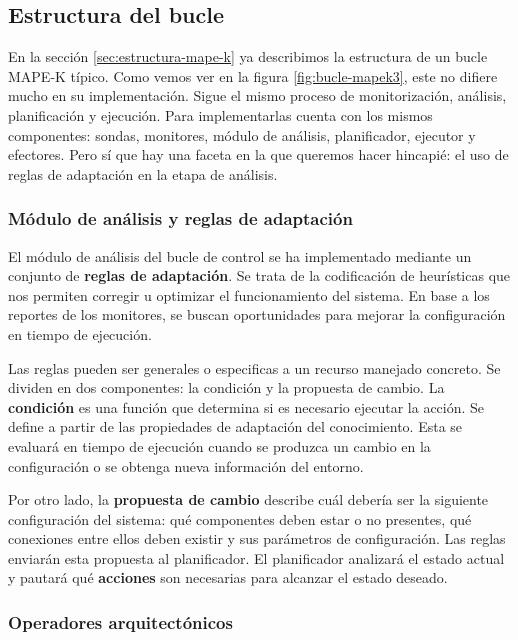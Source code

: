 \subsection{Estructura del bucle}

En la sección \ref{sec:estructura-mape-k} ya describimos la estructura de un bucle MAPE-K típico. Como vemos ver en la figura \ref{fig:bucle-mapek3}, este no difiere mucho en su implementación. Sigue el mismo proceso de monitorización, análisis, planificación y ejecución. Para implementarlas cuenta con los mismos componentes: sondas, monitores, módulo de análisis, planificador, ejecutor y efectores. Pero sí que hay una faceta en la que queremos hacer hincapié: el uso de reglas de adaptación en la etapa de análisis.

\subsubsection{Módulo de análisis y reglas de adaptación}

El módulo de análisis del bucle de control se ha implementado mediante un conjunto de \textbf{reglas de adaptación}. Se trata de la codificación de heurísticas que nos permiten corregir u optimizar el funcionamiento del sistema. En base a los reportes de los monitores, se buscan oportunidades para mejorar la configuración en tiempo de ejecución.

Las reglas pueden ser generales o especificas a un recurso manejado concreto. Se dividen en dos componentes: la condición y la propuesta de cambio. La \textbf{condición} es una función que determina si es necesario ejecutar la acción. Se define a partir de las propiedades de adaptación del conocimiento. Esta se evaluará en tiempo de ejecución cuando se produzca un cambio en la configuración o se obtenga nueva información del entorno.

Por otro lado, la \textbf{propuesta de cambio} describe cuál debería ser la siguiente configuración del sistema: qué componentes deben estar o no presentes, qué conexiones entre ellos deben existir y sus parámetros de configuración. Las reglas enviarán esta propuesta al planificador. El planificador analizará el estado actual y pautará qué \textbf{acciones} son necesarias para alcanzar el estado deseado.

\subsubsection{Operadores arquitectónicos}

